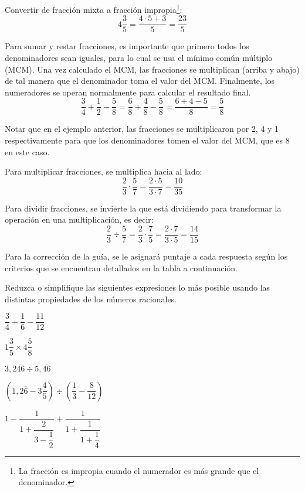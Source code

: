 \documentclass{prueba}
\begin{document}
Convertir de fracción mixta a fracción impropia\footnote{La fracción  es impropia cuando
el numerador es más grande que el denominador.}:
\begin{equation*}
    4\dfrac{3}{5} = \dfrac{4\cdot 5 + 3}{5} = \dfrac{23}{5}
\end{equation*}

Para sumar y restar fracciones, es importante que primero todos los denominadores sean
iguales, para lo cual se usa el mínimo común múltiplo (MCM). Una vez calculado el MCM, 
las fracciones 
se multiplican (arriba y abajo) de tal manera que el denominador toma el valor del MCM.
Finalmente, los numeradores se operan normalmente para calcular el resultado final.
\begin{equation*}
    \dfrac{3}{4} + \dfrac{1}{2} - \dfrac{5}{8} = \dfrac{6}{8} + \dfrac{4}{8} - \dfrac{5}{8} = \dfrac{6+4-5}{8} = \dfrac{5}{8}
\end{equation*}

Notar que en el ejemplo anterior, las fracciones se multiplicaron por 2, 4 y 1 
respectivamente para que los denominadores tomen el valor del MCM, que es 8 en este caso.  

Para multiplicar fracciones, se multiplica hacia al lado:
\begin{equation*}
\dfrac{2}{3}\cdot\dfrac{5}{7} = \dfrac{2\cdot 5}{3 \cdot 7} = \dfrac{10}{35}    
\end{equation*}

Para dividir fracciones, se invierte la que está dividiendo para transformar la operación
en una multiplicación, es decir:
\begin{equation*}
\dfrac{2}{3}\div \dfrac{5}{7} = \dfrac{2}{3}\cdot\dfrac{7}{5} = \dfrac{2\cdot 7}{3\cdot 5} = \dfrac{14}{15}
\end{equation*} 

Para la corrección de la guía, se le asignará puntaje a cada respuesta según los criterios
que se encuentran detallados en la tabla a continuación.

\pauta
\newpage

\parte{} Reduzca o simplifique las siguientes expresiones lo más posible usando 
las distintas propiedades de los números racionales.

\pregunta{} $\dfrac{3}{4} + \dfrac{1}{6} - \dfrac{11}{12}$
\desarrollo[6cm]

\pregunta{} $1\dfrac{3}{5} \times 4\dfrac{5}{8}$
\desarrollo[6cm]

\pregunta{} $3,2\overline{46}\div 5,\overline{46}$
\desarrollo[6cm]

\pregunta{} $\left(1,2\overline{6}-3\dfrac{4}{5}\right)\div\left(\dfrac{1}{3}-\dfrac{8}{12}\right)$
\desarrollo[8cm]

\pregunta{} $1 - \dfrac{1}{1+\dfrac{2}{3-\dfrac{1}{2}}} + \dfrac{1}{1+\dfrac{1}{1+\dfrac{1}{4}}}$
\desarrollo[10cm]
\end{document}
